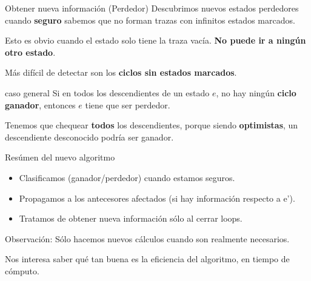 \begin{frame}{Obtener nueva información (Perdedor)}
	Descubrimos nuevos estados perdedores cuando \textbf{seguro} sabemos que no forman trazas con infinitos estados marcados.
	
	\pause 
	
	Esto es obvio cuando el estado solo tiene la traza vacía. \textbf{No puede ir a ningún otro estado}.
	
	\pause 
	
	Más difícil de detectar son los \textbf{ciclos sin estados marcados}.
	
	\pause
	
	\begin{block}{caso general}
		Si en todos los descendientes de un estado $e$, no hay ningún \textbf{ciclo ganador}, entonces $e$ tiene que ser perdedor. 
		
		Tenemos que chequear \textbf{todos} los descendientes, porque siendo \textbf{optimistas}, un descendiente desconocido podría ser ganador.
	\end{block}
	
\end{frame}
\begin{frame}{Resúmen del nuevo algoritmo}
    \begin{itemize}
     \item Clasificamos (ganador/perdedor) cuando estamos seguros. %
     \item Propagamos a los antecesores afectados (si hay información respecto a e').
     \item Tratamos de obtener nueva información sólo al cerrar loops.
    \end{itemize}
    
    \begin{block}{Observación:}
        Sólo hacemos nuevos cálculos cuando son realmente necesarios.
    \end{block}
    
    Nos interesa saber qué tan buena es la eficiencia del algoritmo, en tiempo de cómputo.
\end{frame}


